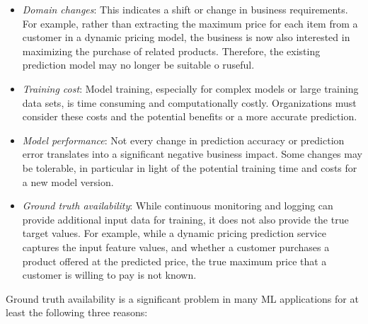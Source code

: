 \begin{itemize}
   \item \emph{Domain changes}: This indicates a shift or change in business requirements. For example, rather than extracting the maximum price for each item from a customer in a dynamic pricing model, the business is now also interested in maximizing the purchase of related products. Therefore, the existing prediction model may no longer be suitable o ruseful.
   \item \emph{Training cost}: Model training, especially for complex models or large training data sets, is time consuming and computationally costly. Organizations must consider these costs and the potential benefits or a more accurate prediction.
   \item \emph{Model performance}: Not every change in prediction accuracy or prediction error translates into a significant negative business impact. Some changes may be tolerable, in particular in light of the potential training time and costs for a new model version.
   \item \emph{Ground truth availability}: While continuous monitoring and logging can provide additional input data for training, it does not also provide the true target values. For example, while a dynamic pricing prediction service captures the input feature values, and whether a customer purchases a product offered at the predicted price, the true maximum price that a customer is willing to pay is not known.
\end{itemize}

Ground truth availability is a significant problem in many ML applications for at least the following three reasons:

